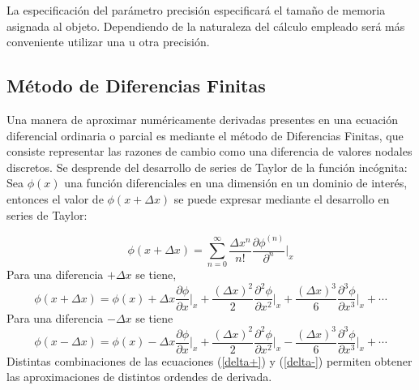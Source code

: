 La especificación del parámetro precisión especificará el tamaño de memoria asignada al objeto. Dependiendo de la naturaleza del cálculo empleado será más conveniente utilizar una u otra precisión.


\subsection{Método de Diferencias Finitas}

Una manera de aproximar numéricamente derivadas presentes en una ecuación diferencial ordinaria o parcial es mediante el método de Diferencias Finitas, que consiste representar las razones de cambio como una diferencia de valores nodales discretos. Se desprende del desarrollo de series de Taylor de la función incógnita: Sea $\phi(x)$ una función diferenciales en una dimensión en un dominio de interés, entonces el valor de $\phi(x + \Delta x)$ se puede expresar mediante el desarrollo en series de Taylor:

\begin{equation} \label{serie_taylor}
\phi( x + \Delta x ) = \sum_{n=0}^{\infty} \dfrac{\Delta x^n}{n!} \dfrac{ \partial \phi^{(n)} } { \partial ^n} \Big|_x
\end{equation}
Para una diferencia $+\Delta x$ se tiene,
\begin{equation} \label{delta+}
\phi( x + \Delta x ) = \phi(x) + \Delta x \dfrac{\partial \phi }{\partial x} \Big|_x + \dfrac{  (\Delta x)^2 }{2} \dfrac{\partial^2 \phi }{\partial x^2} \Big|_x + \dfrac{ (\Delta x)^3 }{6} \dfrac{\partial^3 \phi }{\partial x^3} \Big|_x + \cdots
\end{equation}
Para una diferencia $-\Delta x$ se tiene
\begin{equation} \label{delta-}
\phi( x - \Delta x ) = \phi(x) - \Delta x \dfrac{\partial \phi }{\partial x} \Big|_x + \dfrac{  (\Delta x)^2 }{2} \dfrac{\partial^2 \phi }{\partial x^2} \Big|_x - \dfrac{ (\Delta x)^3 }{6} \dfrac{\partial^3 \phi }{\partial x^3} \Big|_x + \cdots
\end{equation}
Distintas combinaciones de las ecuaciones (\ref{delta+}) y (\ref{delta-}) permiten obtener las aproximaciones de distintos ordendes de derivada.\\

